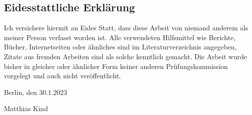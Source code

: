 %
\pagestyle{empty}

\subsection*{Eidesstattliche Erklärung}

Ich versichere hiermit an Eides Statt, dass diese Arbeit von niemand anderem als meiner Person verfasst worden ist. Alle verwendeten Hilfsmittel wie Berichte, Bücher, Internetseiten oder ähnliches sind im Literaturverzeichnis angegeben, Zitate aus fremden Arbeiten sind als solche kenntlich gemacht. Die Arbeit wurde bisher in gleicher oder ähnlicher Form keiner anderen Prüfungskommission vorgelegt und auch nicht veröffentlicht.
\par\bigskip  
\noindent Berlin, den 30.1.2023

\vspace{2.0cm}

\noindent Matthias Kind
